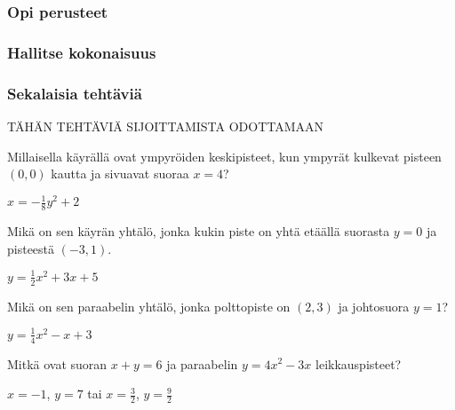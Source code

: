 \begin{tehtavasivu}

\subsubsection*{Opi perusteet}

\subsubsection*{Hallitse kokonaisuus}

\subsubsection*{Sekalaisia tehtäviä}

TÄHÄN TEHTÄVIÄ SIJOITTAMISTA ODOTTAMAAN

\begin{tehtava}
Millaisella käyrällä ovat ympyröiden keskipisteet, kun ympyrät kulkevat pisteen $(0, 0)$ kautta ja sivuavat suoraa $x=4$?
\begin{vastaus}
$x=-\frac{1}{8}y^2+2$
\end{vastaus}
\end{tehtava}

\begin{tehtava}
Mikä on sen käyrän yhtälö, jonka kukin piste on yhtä etäällä suorasta $y=0$ ja pisteestä $(-3, 1)$.
\begin{vastaus}
$y = \frac{1}{2}x^2+3 x+5$
\end{vastaus}
\end{tehtava}

\begin{tehtava}
Mikä on sen paraabelin yhtälö, jonka polttopiste on $(2, 3)$ ja johtosuora $y=1$?
\begin{vastaus}
$y = \frac{1}{4}x^2-x+3$
\end{vastaus}
\end{tehtava}

\begin{tehtava}
Mitkä ovat suoran $x+y=6$ ja paraabelin $y=4x^2-3x$ leikkauspisteet?
\begin{vastaus}
$x = -1$, $ y = 7$ tai $x = \frac{3}{2}$, $y = \frac{9}{2}$
\end{vastaus}
\end{tehtava}


\end{tehtavasivu}
